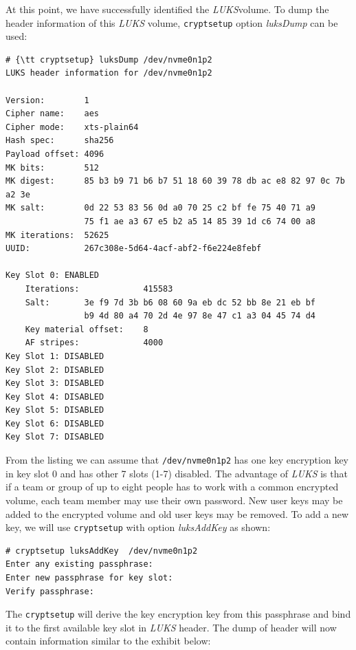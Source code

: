 At this point, we have successfully identified the {\it LUKS}volume.
To dump the header information of this {\it LUKS} volume, {\tt cryptsetup} option {\it luksDump} can be used:
\begin{lstlisting}[columns=fixed,basicstyle=\ttfamily\footnotesize,tabsize=4,backgroundcolor=\color{yellow!10}]
# {\tt cryptsetup} luksDump /dev/nvme0n1p2
LUKS header information for /dev/nvme0n1p2

Version:		1
Cipher name:	aes
Cipher mode:	xts-plain64
Hash spec:		sha256
Payload offset:	4096
MK bits:		512
MK digest:		85 b3 b9 71 b6 b7 51 18 60 39 78 db ac e8 82 97 0c 7b a2 3e
MK salt:		0d 22 53 83 56 0d a0 70 25 c2 bf fe 75 40 71 a9
				75 f1 ae a3 67 e5 b2 a5 14 85 39 1d c6 74 00 a8
MK iterations: 	52625
UUID:          	267c308e-5d64-4acf-abf2-f6e224e8febf

Key Slot 0: ENABLED
	Iterations:				415583
	Salt:		3e f9 7d 3b b6 08 60 9a eb dc 52 bb 8e 21 eb bf
				b9 4d 80 a4 70 2d 4e 97 8e 47 c1 a3 04 45 74 d4
	Key material offset:	8
	AF stripes:				4000
Key Slot 1: DISABLED
Key Slot 2: DISABLED
Key Slot 3: DISABLED
Key Slot 4: DISABLED
Key Slot 5: DISABLED
Key Slot 6: DISABLED
Key Slot 7: DISABLED
\end{lstlisting}
From the listing we can assume that {\tt /dev/nvme0n1p2} has one key encryption key in key slot 0 and has other 7 slots (1-7) disabled.
The advantage of {\it LUKS} is that if a team or group of up to eight people has to work with a common encrypted volume, each team member may use their own password.
New user keys may be added to the encrypted volume and old user keys may be removed.
To add a new key, we will use {\tt cryptsetup} with option {\it luksAddKey} as shown:
\begin{lstlisting}[columns=fixed,basicstyle=\ttfamily\footnotesize,tabsize=4,backgroundcolor=\color{yellow!10}]
# cryptsetup luksAddKey  /dev/nvme0n1p2
Enter any existing passphrase:
Enter new passphrase for key slot:
Verify passphrase:
\end{lstlisting}
The {\tt cryptsetup} will derive the key encryption key from this passphrase and bind it to the first available key slot in {\it LUKS} header.
The dump of header will now contain information similar to the exhibit below:

